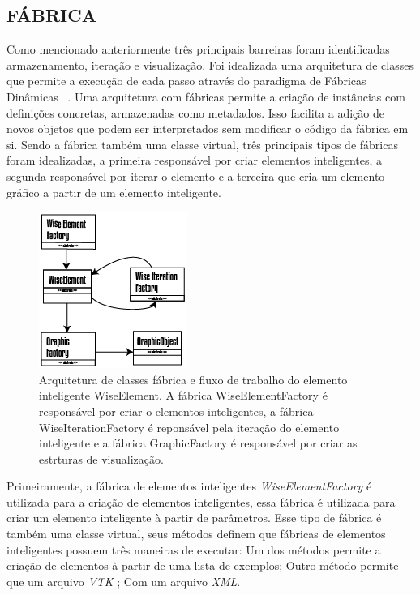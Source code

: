 \documentclass[
        english,			
        brazil			        %
        ,<...>]{abntbibufjf}
\begin{document}
\subsection{FÁBRICA}\label{sec:fabrica} 
 
Como mencionado anteriormente três principais barreiras foram identificadas armazenamento, iteração e visualização. Foi idealizada uma arquitetura de classes que permite a execução de cada passo através do paradigma de Fábricas Dinâmicas~ \cite{factorypattern}. Uma arquitetura com fábricas permite a criação de instâncias com definições concretas, armazenadas como metadados. Isso facilita a adição de novos objetos que podem ser interpretados sem modificar o código da fábrica em si. Sendo a fábrica também uma classe virtual, três principais tipos de fábricas foram idealizadas, a primeira responsável por criar elementos inteligentes, a  segunda responsável por iterar o elemento e a terceira que cria um elemento gráfico a partir de um elemento inteligente.

\begin{figure}[!htbp]
	\centering
	\includegraphics[scale=1]{Figures/WiseElementWorkflow.png}
	\caption{Arquitetura de classes fábrica e fluxo de trabalho do elemento inteligente WiseElement. A fábrica WiseElementFactory é responsável por criar o elementos inteligentes, a fábrica WiseIterationFactory é reponsável pela iteração do elemento inteligente e a fábrica GraphicFactory é responsável por criar as estrturas de visualização. }
	\label{fig2:wiselementsworkflow}
\end{figure}
 
Primeiramente, a fábrica de elementos inteligentes \textit{WiseElementFactory} é utilizada para a criação de elementos inteligentes, essa fábrica é utilizada para criar um elemento inteligente à partir de parâmetros. Esse tipo de fábrica é também uma classe virtual, seus métodos definem que fábricas de elementos inteligentes possuem três maneiras de executar: Um dos métodos permite a criação de elementos à partir de uma lista de exemplos; Outro método permite que um arquivo \textit{VTK} ; Com um arquivo \textit{XML}. 
\end{document}
